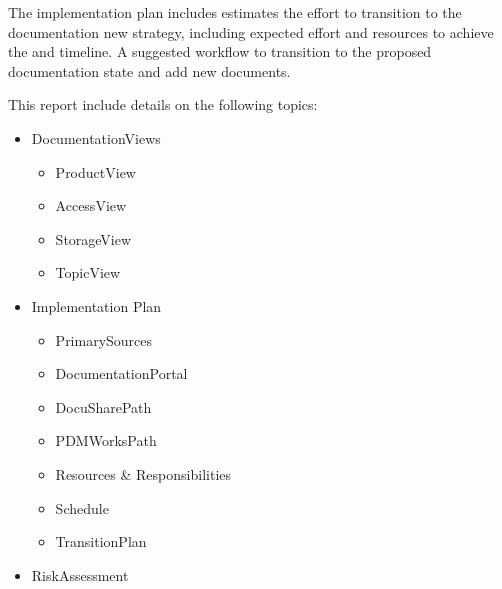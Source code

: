The implementation plan includes estimates the effort to transition to the documentation new strategy, including expected effort and resources to achieve the and timeline. A suggested workflow to transition to the proposed documentation state and add new documents.

This report include details on the following topics:

\begin{itemize}

\item DocumentationViews
	\begin{itemize}
	\item ProductView
	\item AccessView
	\item  StorageView
	\item TopicView
	\end{itemize}

\item Implementation Plan
	\begin{itemize}
	\item PrimarySources
	\item DocumentationPortal
	\item DocuSharePath
	\item PDMWorksPath
	\item Resources \& Responsibilities
	\item Schedule
	\item TransitionPlan
	\end{itemize}

\item RiskAssessment

\end{itemize}
